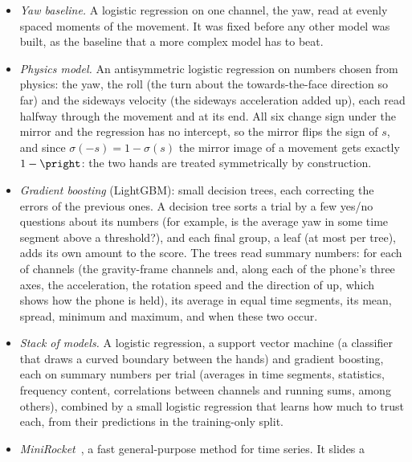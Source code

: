 \begin{itemize}[nosep,leftmargin=1.2em]
  \item \emph{Yaw baseline.} A logistic regression on one channel, the yaw, read at  evenly
    spaced moments of the movement. It was fixed before any other model was built, as the baseline that a more
    complex model has to beat.
  \item \emph{Physics model.} An antisymmetric logistic regression on  numbers chosen from
    physics: the yaw, the roll (the turn about the towards-the-face direction so far) and the sideways velocity (the
    sideways acceleration added up), each read halfway through the movement and at its end. All six change sign
    under the mirror and the regression has no intercept, so the mirror flips the sign of $s$, and since
    $\sigma(-s) = 1 - \sigma(s)$ the mirror image of a movement gets exactly $1 - \pright$: the two hands are
    treated symmetrically by construction.
  \item \emph{Gradient boosting} (LightGBM):  small decision trees, each correcting the errors of
    the previous ones. A decision tree sorts a trial by a few yes/no questions about its numbers (for example, is the
    average yaw in some time segment above a threshold?), and each final group, a leaf (at most 
    per tree), adds its own amount to the score. The trees read  summary
    numbers: for each of  channels (the  gravity-frame channels and,
    along each of the phone's three axes, the acceleration, the rotation speed and the direction of up, which shows
    how the phone is held), its average in  equal time segments, its mean, spread, minimum and maximum,
    and when these two occur.
  \item \emph{Stack of  models.} A logistic regression, a support vector machine (a classifier
    that draws a curved boundary between the hands) and gradient boosting, each on  summary
    numbers per trial (averages in time segments, statistics, frequency content, correlations between channels and
    running sums, among others), combined by a small logistic regression that learns how much to trust each, from
    their predictions in the training-only split.
  \item \emph{MiniRocket}~\cite{dempster2021minirocket}, a fast general-purpose method for time series. It slides a

\end{itemize}
